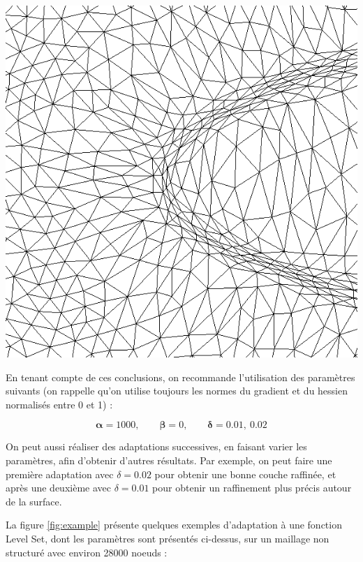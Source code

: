 \begingroup
	\centering
	\includegraphics[scale=.25]{Bordeaux/figures/anisoNormal.png}
\endgroup

\indent

\indent En tenant compte de ces conclusions, on recommande l'utilisation des paramètres suivants (on rappelle qu'on utilise toujours les normes du gradient et du hessien normalisés entre 0 et 1) : 

\begin{equation*}
	\boldsymbol{\alpha} = 1000, \qquad 
	\boldsymbol{\beta} = 0, \qquad
	\boldsymbol{\delta} = 0.01,\  0.02
\end{equation*}

\indent On peut aussi réaliser des adaptations successives, en faisant varier les paramètres, afin d'obtenir d'autres résultats. Par exemple, on peut faire une première adaptation avec \(\delta = 0.02\) pour obtenir une bonne couche raffinée, et après une deuxième avec \(\delta = 0.01\) pour obtenir un raffinement plus précis autour de la surface. 

\indent La figure \ref{fig:example} présente quelques exemples d'adaptation à une fonction Level Set, dont les paramètres sont présentés ci-dessus, sur un maillage non structuré avec environ 28000 noeuds : 

